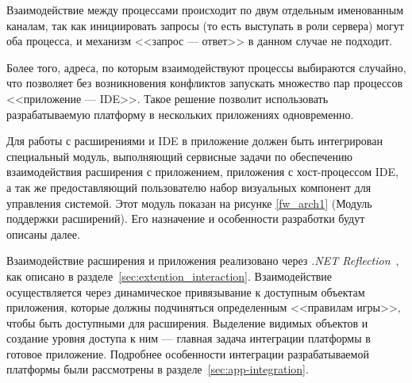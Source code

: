 Взаимодействие между процессами происходит по двум отдельным именованным каналам, так как инициировать запросы (то есть выступать в роли сервера) могут оба процесса, и механизм <<запрос --- ответ>> в данном случае не подходит.

Более того, адреса, по которым взаимодействуют процессы выбираются случайно, что позволяет без возникновения конфликтов запускать множество пар процессов <<приложение --- IDE>>. Такое решение позволит использовать разрабатываемую платформу в нескольких приложениях одновременно.

Для работы с расширениями и IDE в приложение должен быть интегрирован специальный модуль, выполняющий сервисные задачи по обеспечению взаимодействия расширения с приложением, приложения с хост-процессом IDE, а так же предоставляющий пользователю набор визуальных компонент для управления системой. Этот модуль показан на рисунке \ref{fw_arch1} (Модуль поддержки расширений). Его назначение и особенности разработки будут описаны далее.

Взаимодействие расширения и приложения реализовано через {\it .NET Reflection}~\cite{cs2008-dotnet35}, как описано в разделе~\ref{sec:extention_interaction}. Взаимодействие осуществляется через динамическое привязывание к доступным объектам приложения, которые должны подчиняться определенным <<правилам игры>>, чтобы быть доступными для расширения. Выделение видимых объектов и создание уровня доступа к ним --- главная задача интеграции платформы в готовое приложение. Подробнее особенности интеграции разрабатываемой платформы были рассмотрены в разделе~\ref{sec:app-integration}.